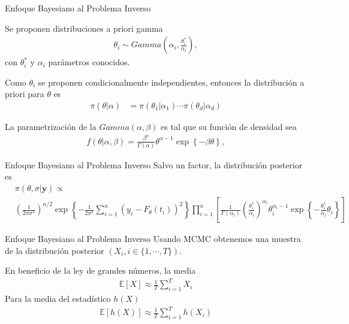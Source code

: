 \documentclass[10pt,aspectratio=169]{beamer}
\begin{document}
\begin{frame}{Enfoque Bayesiano al Problema Inverso}

  Se proponen distribuciones a priori gamma
  \begin{align}
    \theta_i \sim Gamma\left(\alpha_i, \frac{\theta_i^{*}}{\alpha_i} \right),
    \label{3.2.1.03}
  \end{align}
  con $\theta_i^{*}$ y $\alpha_i$ parámetros conocidos.
  
  Como $\theta_i$ se proponen condicionalmente independientes, entonces la distribución a priori para $\theta$ es
  \begin{align}
    \pi(\theta|\alpha) &= \pi(\theta_1|\alpha_1) \cdots \pi(\theta_d|\alpha_d)
    \label{3.2.1.04}
  \end{align}
  
  \vspace{0.5 cm}

  La parametrización de la $Gamma(\alpha,\beta)$ es tal que su función de densidad sea
  \begin{align*}
    f(\theta|\alpha,\beta) = \frac{\beta^\alpha}{\Gamma(\alpha)} \theta^{\alpha-1} \exp \left \{ -\beta \theta\right \},
  \end{align*}
\end{frame}

\begin{frame}{Enfoque Bayesiano al Problema Inverso}
  Salvo un factor, la distribución posterior es 
  \begin{align}
    &\pi(\theta, \sigma|\mathbf{y}) \propto  \nonumber\\ &\left(\frac{1}{2\pi \sigma^2}\right) ^{n/2}\exp \left \{  -\frac{1}{2\sigma^2}\sum_{i = 1}^{n} \left(y_i - F_{\theta}(t_i)\right)^2 \right \} \prod_{i = 1}^{n} \left[\frac{1}{\Gamma(\alpha_i)}\left(\frac{\theta_i^{*}}{\alpha_i}\right) ^{\alpha_i} \theta_i^{\alpha_i -1} \exp \left \{ -\frac{\theta_i^{*}}{\alpha_i}\theta_i\right \}\right] 
    \label{3.2.1.06}
  \end{align}
\end{frame}

\begin{frame}{Enfoque Bayesiano al Problema Inverso}
  Usando MCMC obtenemos una muestra de la distribución posterior $(X_i, i \in \{1,\cdots, T\})$.

  En beneficio de la ley de grandes números, la media 
  \begin{align}
    \mathbb{E}\left [X\right ] \approx \frac{1}{T}\sum_{i = 1}^{T} X_i
  \end{align}
  Para la media del estadístico $h(X)$ 
  \begin{align}
    \mathbb{E}\left [h(X)\right ] \approx \frac{1}{T} \sum_{i=1}^{T} h(X_i)
    \label{3.2.2.01}
  \end{align}

\end{frame}
\end{document}
